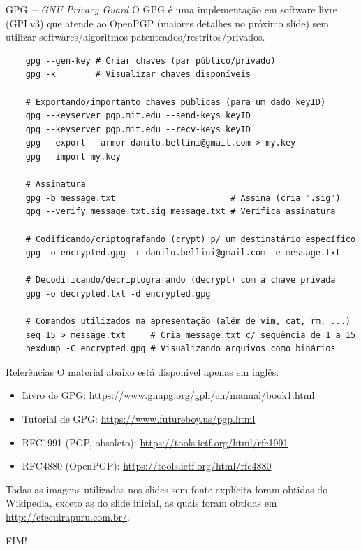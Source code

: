 \documentclass[utf8]{beamer}
\begin{document}
\begin{frame}[fragile]{GPG~-- \emph{GNU Privacy Guard}}
  O GPG é uma implementação em software livre (GPLv3)
  que atende ao OpenPGP (maiores detalhes no próximo slide)
  sem utilizar softwares/algoritmos patenteados/restritos/privados.
  \begin{verbatim}
    gpg --gen-key # Criar chaves (par público/privado)
    gpg -k        # Visualizar chaves disponíveis

    # Exportando/importanto chaves públicas (para um dado keyID)
    gpg --keyserver pgp.mit.edu --send-keys keyID
    gpg --keyserver pgp.mit.edu --recv-keys keyID
    gpg --export --armor danilo.bellini@gmail.com > my.key
    gpg --import my.key

    # Assinatura
    gpg -b message.txt                       # Assina (cria ".sig")
    gpg --verify message.txt.sig message.txt # Verifica assinatura

    # Codificando/criptografando (crypt) p/ um destinatário específico
    gpg -o encrypted.gpg -r danilo.bellini@gmail.com -e message.txt

    # Decodificando/decriptografando (decrypt) com a chave privada
    gpg -o decrypted.txt -d encrypted.gpg

    # Comandos utilizados na apresentação (além de vim, cat, rm, ...)
    seq 15 > message.txt     # Cria message.txt c/ sequência de 1 a 15
    hexdump -C encrypted.gpg # Visualizando arquivos como binários
  \end{verbatim}
\end{frame}


\begin{frame}{Referências}
  O material abaixo está disponível apenas em inglês.
  \begin{itemize}
    \item Livro de GPG:
          \url{https://www.gnupg.org/gph/en/manual/book1.html}
    \item Tutorial de GPG:
          \url{https://www.futureboy.us/pgp.html}
    \item RFC1991 (PGP, obsoleto):
          \url{https://tools.ietf.org/html/rfc1991}
    \item RFC4880 (OpenPGP):
          \url{https://tools.ietf.org/html/rfc4880}
  \end{itemize}
  Todas as imagens utilizadas nos slides sem fonte explícita
  foram obtidas do Wikipedia,
  exceto as do slide inicial,
  as quais foram obtidas em \url{http://etecuirapuru.com.br/}.
\end{frame}


\begin{frame}
  \begin{center}\fontsize{5cm}{2.5cm}\selectfont
    FIM!
  \end{center}
\end{frame}
\end{document}
